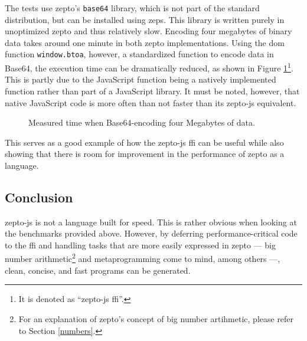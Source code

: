 \documentclass[oneside,11pt,xetex]{scrbook}
\begin{document}
The tests use zepto's \texttt{base64} library, which is not part of the
standard distribution, but can be installed using \gls{zeps}. This library
is written purely in unoptimized zepto and thus relatively slow. Encoding four
megabytes of binary data takes around one minute in both zepto implementations.
Using the \gls{dom} function \texttt{window.btoa}, however, a standardized function
to encode data in Base64, the execution time  can be dramatically reduced, as shown
in Figure \ref{fig:base64}\footnote{It is denoted as ``zepto-js \gls{ffi}''.}. This
is partly due to the JavaScript function being a natively implemented function rather
than part of a JavaScript library. It must be noted, however, that native JavaScript
code is more often than not faster than its zepto-js equivalent.

\begin{figure}
\centering
  \caption{Measured time when Base64-encoding four Megabytes of data.}
  \label{fig:base64}
\end{figure}

This serves as a good example of how the zepto-js \gls{ffi} can be useful while
also showing that there is room for improvement in the performance of zepto as
a language.

\subsection{Conclusion}

zepto-js is not a language built for speed. This is rather obvious when looking
at the benchmarks provided above. However, by deferring performance-critical code
to the \gls{ffi} and handling tasks that are more easily expressed in zepto ---
big number arithmetic\footnote{For an explanation of zepto's concept of big number
artihmetic, please refer to Section \ref{numbers}.} and metaprogramming come to
mind, among others ---, clean, concise, and fast programs can be generated.
\end{document}
